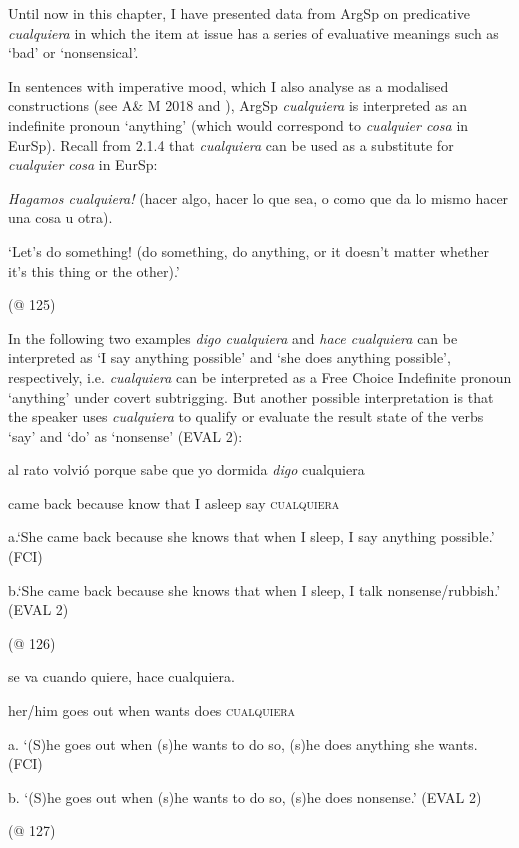 Until now in this chapter, I have presented data from ArgSp on predicative \textit{cualquiera} in which the item at issue has a series of evaluative meanings such as ‘bad’ or ‘nonsensical’. 

  In sentences with imperative mood, which I also analyse as a modalised constructions (see A\& M 2018 and ), ArgSp \textit{cualquiera} is interpreted as an indefinite pronoun ‘anything’ (which would correspond to \textit{cualquier cosa} in EurSp). Recall from 2.1.4 that \textit{cualquiera} can be used as a substitute for \textit{cualquier cosa} in EurSp:

    \textit{Hagamos cualquiera!} (hacer algo, hacer lo que sea, o como que da lo mismo hacer una cosa u otra).

    ‘Let’s do something! (do something, do anything, or it doesn’t matter whether it’s this thing or the other).’

(@ 125) 

In the following two examples \textit{digo cualquiera} and \textit{hace cualquiera} can be interpreted as ‘I say anything possible’ and ‘she does anything possible’, respectively, i.e. \textit{cualquiera} can be interpreted as a Free Choice Indefinite pronoun ‘anything’ under covert subtrigging. But another possible interpretation is that the speaker uses \textit{cualquiera} to qualify or evaluate the result state of the verbs ‘say’ and ‘do’ as ‘nonsense’ (EVAL 2):

    al  rato  volvió  porque  sabe  que  yo  dormida  \textit{digo} cualquiera

        came back  because  know  that  I  asleep  say  \textsc{cualquiera}

    a.‘She came back because she knows that when I sleep, I say anything possible.’ (FCI)

b.‘She came back because she knows that when I sleep, I talk nonsense/rubbish.’ (EVAL 2)

    (@ 126)

    se  va  cuando  quiere,  hace  cualquiera.

    her/him  goes out  when  wants  does  \textsc{cualquiera}

    a. ‘(S)he goes out when (s)he wants to do so, (s)he does anything she wants.        (FCI)

b. ‘(S)he goes out when (s)he wants to do so, (s)he does nonsense.’                       (EVAL 2)

    (@ 127)

